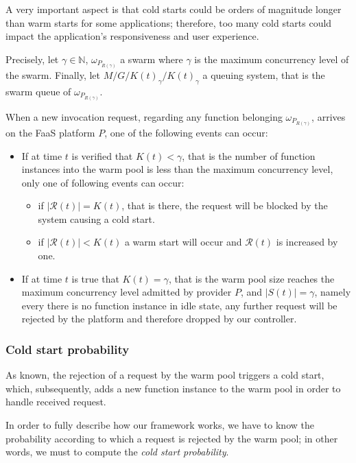\documentclass[12pt,a4paper]{report}
\newcommand*{\N}{\mathbb{N}}
\theoremstyle{definition}
\begin{document}
A very important aspect is that cold starts could be orders of magnitude longer than warm starts for some applications; therefore, too many cold starts could impact the application’s responsiveness and user experience.

Precisely, let $\gamma \in \N$, $\omega_{P_{R(\gamma)}}$ a swarm where $\gamma$ is the maximum concurrency level of the swarm. Finally, let $M/G/K(t)_{\gamma}/K(t)_{\gamma}$ a queuing system, that is the swarm queue of $\omega_{P_{R(\gamma)}}$. 

When a new invocation request, regarding any function belonging $\omega_{P_{R(\gamma)}}$, arrives on the FaaS platform $P$, one of the following events can occur:

\begin{itemize}
	\item If at time $t$ is verified that $K(t) < \gamma$, that is the number of function instances into the warm pool is less than the maximum concurrency level, only one of following events can occur:
	
	\begin{itemize}
		\item if $|\mathcal{R}(t)| = K(t)$, that is there, the request will be blocked by the system causing a cold start.
		
		\item if $|\mathcal{R}(t)| < K(t)$ a warm start will occur and $\mathcal{R}(t)$ is increased by one.
	\end{itemize}
	
	\item If at time $t$ is true that $K(t) = \gamma$, that is the warm pool size reaches the maximum concurrency level admitted by provider $P$, and $|S(t)| = \gamma$, namely every there is no function instance in idle state, any further request will be rejected by the platform and therefore dropped by our controller.
	
\end{itemize}

\subsubsection{Cold start probability}

As known, the rejection of a request by the warm pool triggers a cold start, which, subsequently, adds a new function instance to the warm pool in order to handle received request. 

In order to fully describe how our framework works, we have to know the probability according to which a request is rejected by the warm pool; in other words, we must to compute the \textit{cold start probability}. 
\end{document}
